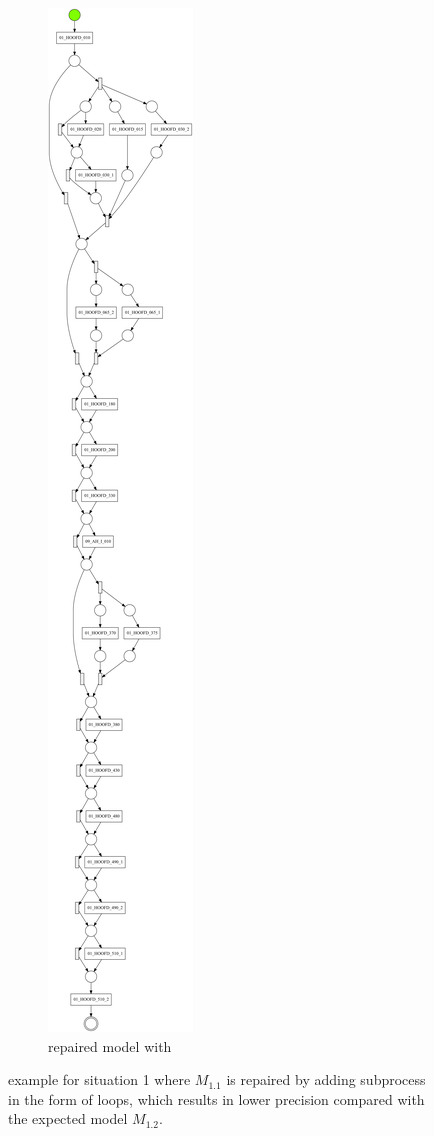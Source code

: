 \begin{figure}[h]
\begin{subfigure}[b]{0.48\textwidth}
	\end{subfigure}%
	\begin{subfigure}[b]{0.48\textwidth}
		\centering
		\includegraphics[width=0.5\linewidth, height=0.7\textheight]{figures/evaluation/PN-result-D5-3-M1-dfg-1-1-1.pdf}
		\caption{repaired model with }
		\label{fig:model_dfg}
	\end{subfigure}
	\caption{example for situation 1 where $M_{1.1}$ is repaired by adding subprocess in the form of loops, which results in lower precision compared with the expected model $M_{1.2}$.}
	\label{fig:model_change_1}
\end{figure}




